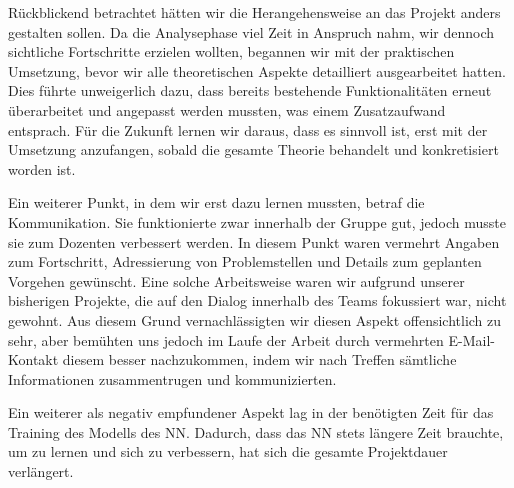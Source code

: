 \documentclass[12pt,a4paper]{article}
\begin{document}
Rückblickend betrachtet hätten wir die Herangehensweise an das Projekt anders gestalten sollen. Da die Analysephase viel Zeit in Anspruch nahm, wir dennoch sichtliche Fortschritte erzielen wollten, begannen wir mit der praktischen Umsetzung, bevor wir alle theoretischen Aspekte detailliert ausgearbeitet hatten. Dies führte unweigerlich dazu, dass bereits bestehende Funktionalitäten erneut überarbeitet und angepasst werden mussten, was einem Zusatzaufwand entsprach. Für die Zukunft lernen wir daraus, dass es sinnvoll ist, erst mit der Umsetzung anzufangen, sobald die gesamte Theorie behandelt und konkretisiert worden ist.

Ein weiterer Punkt, in dem wir erst dazu lernen mussten, betraf die Kommunikation. Sie funktionierte zwar innerhalb der Gruppe gut, jedoch musste sie zum Dozenten verbessert werden. In diesem Punkt waren vermehrt Angaben zum Fortschritt, Adressierung von Problemstellen und Details zum geplanten Vorgehen gewünscht. Eine solche Arbeitsweise waren wir aufgrund unserer bisherigen Projekte, die auf den Dialog innerhalb des Teams fokussiert war, nicht gewohnt. Aus diesem Grund vernachlässigten wir diesen Aspekt offensichtlich zu sehr, aber bemühten uns jedoch im Laufe der Arbeit durch vermehrten E-Mail-Kontakt diesem besser nachzukommen, indem wir nach Treffen sämtliche Informationen zusammentrugen und kommunizierten.

Ein weiterer als negativ empfundener Aspekt lag in der benötigten Zeit für das Training des Modells des NN. Dadurch, dass das NN stets längere Zeit brauchte, um zu lernen und sich zu verbessern, hat sich die gesamte Projektdauer verlängert.


\pagebreak


\end{document}
